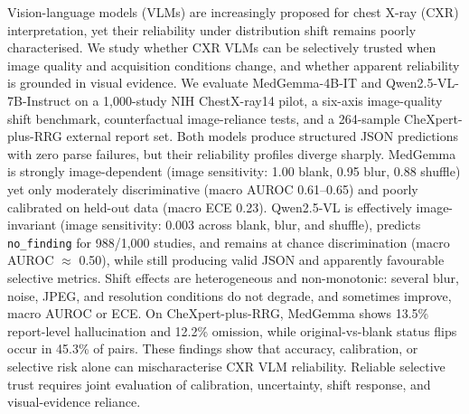 Vision-language models (VLMs) are increasingly proposed for chest X-ray (CXR) interpretation, yet their reliability under distribution shift remains poorly characterised. We study whether CXR VLMs can be selectively trusted when image quality and acquisition conditions change, and whether apparent reliability is grounded in visual evidence. We evaluate MedGemma-4B-IT and Qwen2.5-VL-7B-Instruct on a 1,000-study NIH ChestX-ray14 pilot, a six-axis image-quality shift benchmark, counterfactual image-reliance tests, and a 264-sample CheXpert-plus-RRG external report set. Both models produce structured JSON predictions with zero parse failures, but their reliability profiles diverge sharply. MedGemma is strongly image-dependent (image sensitivity: 1.00 blank, 0.95 blur, 0.88 shuffle) yet only moderately discriminative (macro AUROC 0.61--0.65) and poorly calibrated on held-out data (macro ECE 0.23). Qwen2.5-VL is effectively image-invariant (image sensitivity: 0.003 across blank, blur, and shuffle), predicts \texttt{no\_finding} for 988/1,000 studies, and remains at chance discrimination (macro AUROC $\approx$ 0.50), while still producing valid JSON and apparently favourable selective metrics. Shift effects are heterogeneous and non-monotonic: several blur, noise, JPEG, and resolution conditions do not degrade, and sometimes improve, macro AUROC or ECE. On CheXpert-plus-RRG, MedGemma shows 13.5\% report-level hallucination and 12.2\% omission, while original-vs-blank status flips occur in 45.3\% of pairs. These findings show that accuracy, calibration, or selective risk alone can mischaracterise CXR VLM reliability. Reliable selective trust requires joint evaluation of calibration, uncertainty, shift response, and visual-evidence reliance.
